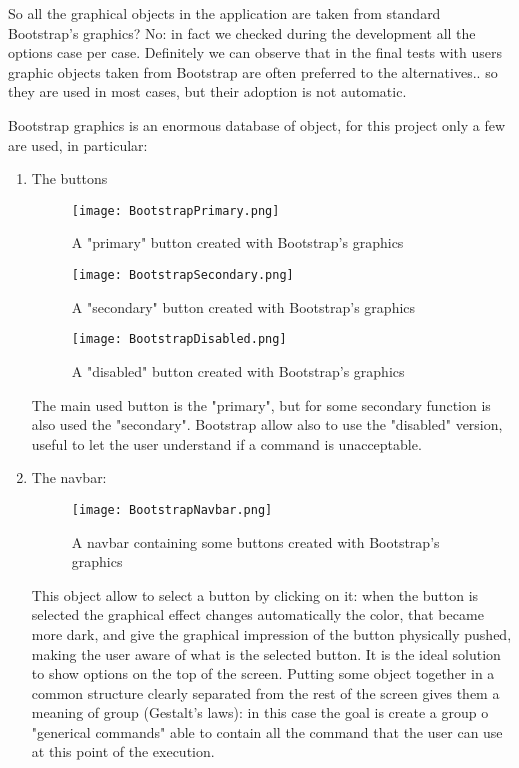 So all the graphical objects in the application are taken from standard Bootstrap's graphics? No: in fact we checked during the development all the options case per case. Definitely we can observe that in the final tests with users graphic objects taken from Bootstrap are often preferred to the alternatives.. so they are used in most cases, but their adoption is not automatic.  

Bootstrap graphics is an enormous database of object, for this project only a few are used, in particular:

\begin{enumerate}

\item The buttons

\begin{figure}[H]
\centering
\texttt{[image: BootstrapPrimary.png]} 
\caption{A "primary" button created with Bootstrap's graphics}
\end{figure}

\begin{figure}[H]
\centering
\texttt{[image: BootstrapSecondary.png]} 
\caption{A "secondary" button created with Bootstrap's graphics}
\end{figure}

\begin{figure}[H]
\centering
\texttt{[image: BootstrapDisabled.png]} 
\caption{A "disabled" button created with Bootstrap's graphics}
\end{figure}

The main used button is the "primary", but for some secondary function is also used the "secondary". Bootstrap allow also to use the "disabled" version, useful to let the user understand if a command is unacceptable.
 

\item The navbar:

\begin{figure}[H]
\centering
\texttt{[image: BootstrapNavbar.png]} 
\caption{A navbar containing some buttons created with Bootstrap's graphics}
\end{figure}

This object allow to select a button by clicking on it: when the button is selected the graphical effect changes automatically the color, that became more dark, and give the graphical impression of the button physically pushed, making the user aware of what is the selected button. It is the ideal solution to show options on the top of the screen. 
Putting some object together in a common structure clearly separated from the rest of the screen gives them a meaning of group (Gestalt's laws): in this case the goal is create a group o "generical commands" able to contain all the command that the user can use at this point of the execution.  



\end{enumerate}
